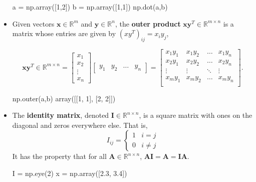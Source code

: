 \begin{itemize}
\begin{python}
a = np.array([1,2])
b = np.array([1,1])
np.dot(a,b)
\end{python}

\item Given vectors $\textbf{x} \in \mathbb{R}^{m}$ and $\textbf{y} \in \mathbb{R}^{n}$, the {\bf outer product} $\textbf{xy}^{T} \in \mathbb{R}^{m\times n}$
is a matrix whose entries are given by $({xy}^{T})_{ij}=x_{i}y_{j}$,


\begin{equation*}
\textbf{xy}^{T} \in \mathbb{R}^{m\times n} = \left[\begin{array}{c}
x_{1} \\ x_{2} \\ \vdots \\ x_{n}\end{array}\right] \left[\begin{array}{cccc}
y_{1} &
y_{2} &
\ldots &
y_{n}
\end{array}\right] =   \left[\begin{array}{cccc}
x_{1}y_{1} & x_{1}y_{2} & \ldots & x_{1}y_{n} \\
x_{2}y_{1} & x_{2}y_{2} & \ldots & x_{2}y_{n} \\
\vdots & \vdots & \ddots & \vdots \\
x_{m}y_{1} & x_{m}y_{2} & \ldots & x_{m}y_{n} \\
\end{array}\right].
\end{equation*}

\begin{python}
np.outer(a,b)
array([[1, 1],
       [2, 2]])
\end{python}


\item The {\bf identity matrix}, denoted $\textbf{I}\in \mathbb{R}^{n\times n}$, is a square matrix with ones on the diagonal and zeros 
everywhere else. That is,
\begin{equation*}
I_{ij}=\left\{\begin{array}{cc}
1 & i=j \\
0 & i\neq j
\end{array}\right.
\end{equation*}
It has the property that for all $\textbf{A} \in \mathbb{R}^{n \times n}$, $\textbf{AI} = \textbf{A} = \textbf{IA}.$

\begin{python}
I = np.eye(2)
x = np.array([2.3, 3.4])


\end{python}
\end{itemize}
